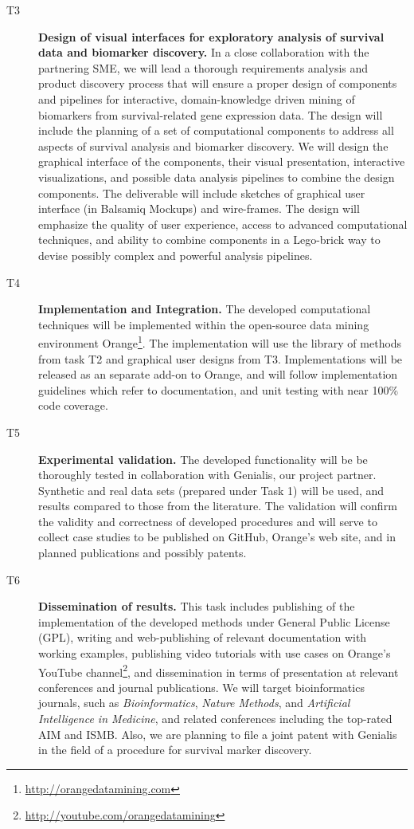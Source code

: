\documentclass[11pt,a4paper]{article}
\newcommand{\myurl}[1]{\footnote{\url{#1}}}
\renewcommand{\bold}{\textbf}
\begin{document}
\begin{description}
	\item[T3] \bold{Design of visual interfaces for exploratory analysis of survival data and biomarker discovery.} In a close collaboration with the partnering SME, we will lead a thorough requirements analysis and product discovery process that will ensure a proper design of components and pipelines for interactive, domain-knowledge driven mining of biomarkers from survival-related gene expression data. The design will include the planning of a set of computational components to address all aspects of survival analysis and biomarker discovery. We will design the graphical interface of the components, their visual presentation, interactive visualizations, and possible data analysis pipelines to combine the design components. The deliverable will include sketches of graphical user interface (in Balsamiq Mockups) and wire-frames. The design will emphasize the quality of user experience, access to advanced computational techniques, and ability to combine components in a Lego-brick way to devise possibly complex and powerful analysis pipelines.
 	\item[T4] \bold{Implementation and Integration.} The developed computational techniques will be implemented within the open-source data mining environment Orange\myurl{http://orangedatamining.com}. The implementation will use the library of methods from task T2 and graphical user designs from T3. Implementations will be released as an separate add-on to Orange, and will follow implementation guidelines which refer to documentation, and unit testing with near 100\% code coverage.
 	\item[T5] \bold{Experimental validation.} The developed functionality will be be thoroughly tested in collaboration with Genialis, our project partner. Synthetic and real data sets (prepared under Task 1) will be used, and results compared to those from the literature. The validation will confirm the validity and correctness of developed procedures and will serve to collect case studies to be published on GitHub, Orange's web site, and in planned publications and possibly patents.
 	\item[T6] \bold{Dissemination of results.} This task includes publishing of the implementation of the developed methods under General Public License (GPL), writing and web-publishing of relevant documentation with working examples, publishing video tutorials with use cases on Orange's YouTube channel\myurl{http://youtube.com/orangedatamining}, and dissemination in terms of presentation at relevant conferences and journal publications. We will target bioinformatics journals, such as {\em Bioinformatics}, {\em Nature Methods}, and {\em Artificial Intelligence in Medicine}, and related conferences including the top-rated AIM and ISMB. Also, we are planning to file a joint patent with Genialis in the field of a procedure for survival marker discovery.
\end{description}
\end{document}
